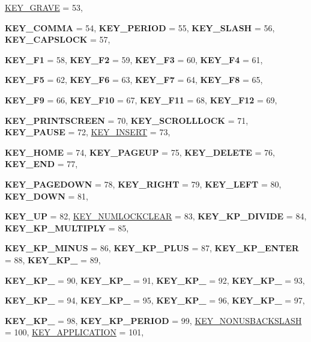 \begin{DoxyCompactItemize}
\hyperlink{classphys_1_1MetaCode_a3e501cbb5bf0f6f1fdb7211465bda8d8a1961eccca163bf3ceb9e6dea3c23375c}{KEY\_\-GRAVE} =  53, 
\par
{\bfseries KEY\_\-COMMA} =  54, 
{\bfseries KEY\_\-PERIOD} =  55, 
{\bfseries KEY\_\-SLASH} =  56, 
{\bfseries KEY\_\-CAPSLOCK} =  57, 
\par
{\bfseries KEY\_\-F1} =  58, 
{\bfseries KEY\_\-F2} =  59, 
{\bfseries KEY\_\-F3} =  60, 
{\bfseries KEY\_\-F4} =  61, 
\par
{\bfseries KEY\_\-F5} =  62, 
{\bfseries KEY\_\-F6} =  63, 
{\bfseries KEY\_\-F7} =  64, 
{\bfseries KEY\_\-F8} =  65, 
\par
{\bfseries KEY\_\-F9} =  66, 
{\bfseries KEY\_\-F10} =  67, 
{\bfseries KEY\_\-F11} =  68, 
{\bfseries KEY\_\-F12} =  69, 
\par
{\bfseries KEY\_\-PRINTSCREEN} =  70, 
{\bfseries KEY\_\-SCROLLLOCK} =  71, 
{\bfseries KEY\_\-PAUSE} =  72, 
\hyperlink{classphys_1_1MetaCode_a3e501cbb5bf0f6f1fdb7211465bda8d8a708ea6204b1cc2ed7756989b8d850ce6}{KEY\_\-INSERT} =  73, 
\par
{\bfseries KEY\_\-HOME} =  74, 
{\bfseries KEY\_\-PAGEUP} =  75, 
{\bfseries KEY\_\-DELETE} =  76, 
{\bfseries KEY\_\-END} =  77, 
\par
{\bfseries KEY\_\-PAGEDOWN} =  78, 
{\bfseries KEY\_\-RIGHT} =  79, 
{\bfseries KEY\_\-LEFT} =  80, 
{\bfseries KEY\_\-DOWN} =  81, 
\par
{\bfseries KEY\_\-UP} =  82, 
\hyperlink{classphys_1_1MetaCode_a3e501cbb5bf0f6f1fdb7211465bda8d8a7cd4a721f5b2be2cc13856a46199508a}{KEY\_\-NUMLOCKCLEAR} =  83, 
{\bfseries KEY\_\-KP\_\-DIVIDE} =  84, 
{\bfseries KEY\_\-KP\_\-MULTIPLY} =  85, 
\par
{\bfseries KEY\_\-KP\_\-MINUS} =  86, 
{\bfseries KEY\_\-KP\_\-PLUS} =  87, 
{\bfseries KEY\_\-KP\_\-ENTER} =  88, 
{\bfseries KEY\_\-KP\_} =  89, 
\par
{\bfseries KEY\_\-KP\_} =  90, 
{\bfseries KEY\_\-KP\_} =  91, 
{\bfseries KEY\_\-KP\_} =  92, 
{\bfseries KEY\_\-KP\_} =  93, 
\par
{\bfseries KEY\_\-KP\_} =  94, 
{\bfseries KEY\_\-KP\_} =  95, 
{\bfseries KEY\_\-KP\_} =  96, 
{\bfseries KEY\_\-KP\_} =  97, 
\par
{\bfseries KEY\_\-KP\_} =  98, 
{\bfseries KEY\_\-KP\_\-PERIOD} =  99, 
\hyperlink{classphys_1_1MetaCode_a3e501cbb5bf0f6f1fdb7211465bda8d8a858a1c9e3bd7b047e05220da9b0a3966}{KEY\_\-NONUSBACKSLASH} =  100, 
\hyperlink{classphys_1_1MetaCode_a3e501cbb5bf0f6f1fdb7211465bda8d8a2e2aa499dcbb30b92204e9895049ad91}{KEY\_\-APPLICATION} =  101, 

\end{DoxyCompactItemize}
